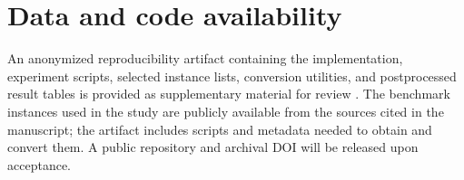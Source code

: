 \section*{Data and code availability}
An anonymized reproducibility artifact containing the implementation, experiment scripts, selected instance lists, conversion utilities, and postprocessed result tables is provided as supplementary material for review \cite{anonymous_artifact_2026}. The benchmark instances used in the study are publicly available from the sources cited in the manuscript; the artifact includes scripts and metadata needed to obtain and convert them. A public repository and archival DOI will be released upon acceptance.
